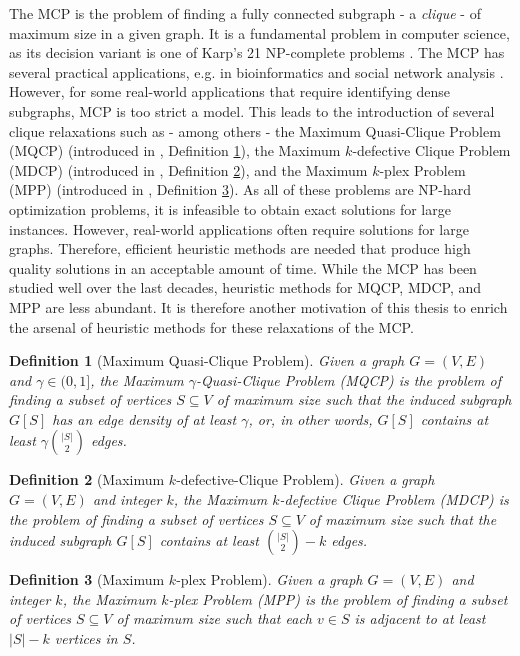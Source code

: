 \documentclass[11pt]{article}
\newtheorem{definition}{Definition}[section]
\begin{document}
The MCP is the problem of finding a fully connected subgraph - a \textit{clique} - of maximum size in a given graph. It is a fundamental problem in computer science, as its decision variant is one of Karp's 21 NP-complete problems \cite{Karp1972}. The MCP has several practical applications, e.g. in bioinformatics \cite{Dognin2010} and social network analysis \cite{Pattillo_network_analysis_2013}. However, for some real-world applications that require identifying dense subgraphs, MCP is too strict a model. This leads to the introduction of several clique relaxations such as - among others - the Maximum Quasi-Clique Problem (MQCP) (introduced in \cite{Abello2002}, Definition \ref{def:mqcp}), the Maximum $k$-defective Clique Problem (MDCP) (introduced in \cite{Yu2006}, Definition \ref{def:mdcp}), and the Maximum $k$-plex Problem (MPP) (introduced in \cite{Seidman1978}, Definition \ref{def:mpp}). 
As all of these problems are NP-hard optimization problems, it is infeasible to obtain exact solutions for large instances. However, real-world applications often require solutions for large graphs. Therefore, efficient heuristic methods are needed that produce high quality solutions in an acceptable amount of time. While the MCP has been studied well over the last decades, heuristic methods for MQCP, MDCP, and MPP are less abundant. It is therefore another motivation of this thesis to enrich the arsenal of heuristic methods for these relaxations of the MCP. 

\begin{definition}[Maximum Quasi-Clique Problem]
	\label{def:mqcp}
	Given a graph $G = (V,E)$ and $\gamma \in (0,1]$, the Maximum $\gamma$-Quasi-Clique Problem (MQCP) is the problem of finding a subset of vertices $S \subseteq V$ of maximum size 
	such that the induced subgraph $G[S]$ has an edge density of at least $\gamma$, or, in other words, $G[S]$ contains at least $\gamma \binom{|S|}{2}$ edges. 
\end{definition}

\begin{definition}[Maximum $k$-defective-Clique Problem]
	\label{def:mdcp}
	Given a graph $G = (V,E)$ and integer $k$, the Maximum $k$-defective Clique Problem (MDCP) is the problem of finding a subset of vertices $S \subseteq V$ of maximum size 
	such that the induced subgraph $G[S]$ contains at least $\binom{|S|}{2} - k$ edges. 
\end{definition}

\begin{definition}[Maximum $k$-plex Problem]
	\label{def:mpp}
	Given a graph $G = (V,E)$ and integer $k$, the Maximum $k$-plex Problem (MPP) is the problem of finding a subset of vertices $S \subseteq V$ of maximum size 
	such that each $v \in S$ is adjacent to at least $|S| - k$ vertices in $S$. 
\end{definition}
\end{document}
